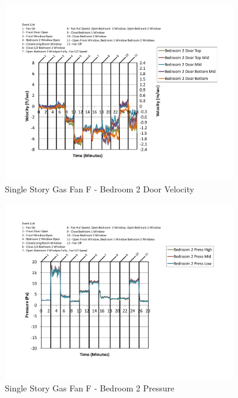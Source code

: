 \documentclass{article}
\begin{document}
\begin{appendices}
	\begin{figure}[H]
		\centering
		\includegraphics[height=3.05in,trim=0.67in 1.1in 0.67in 0.8in,clip=true]{0_Images/Results_Charts/ColdFlow/Single_Story/Gas/F/Bedroom_2_Door_Velocity.pdf}
		\caption{Single Story Gas Fan F - Bedroom 2 Door Velocity}
	\end{figure}
 

	\begin{figure}[H]
		\centering
		\includegraphics[height=3.05in,trim=0.67in 1.1in 0.67in 0.8in,clip=true]{0_Images/Results_Charts/ColdFlow/Single_Story/Gas/F/Bedroom_2_Pressure.pdf}
		\caption{Single Story Gas Fan F - Bedroom 2 Pressure}
	\end{figure}
 
	\clearpage


\end{appendices}
\end{document}
